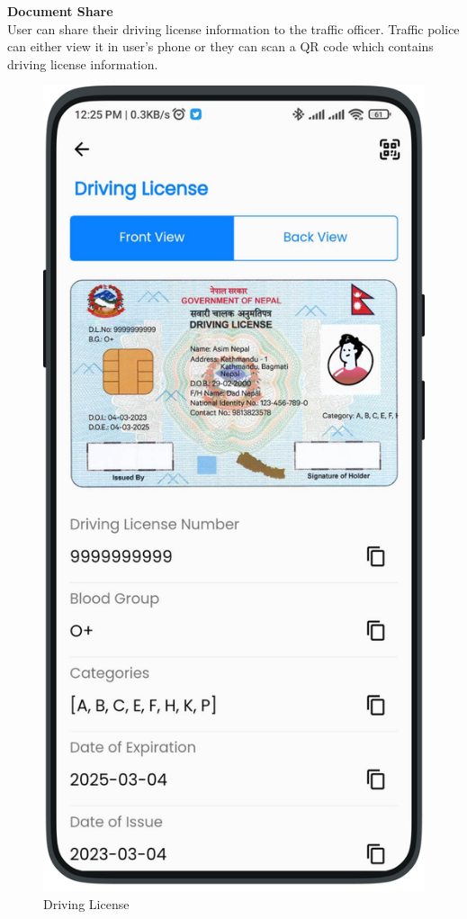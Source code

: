 \textbf{Document Share}\\
        User can share their driving license information to the traffic officer. Traffic police can either view it in user's phone or they can scan a QR code which contains driving license information.
        \begin{multicols}{2}
           \begin{figure}[H]
        \centering
        \includegraphics[width=0.6\linewidth]{images/results/mobile/DrivingLicense.png}
        \caption[Driving License ]{Driving License}
        \label{fig:DrivingLicense.png}
        \end{figure} 
        \begin{figure}[H]
        \centering

\end{figure}
\end{multicols}
